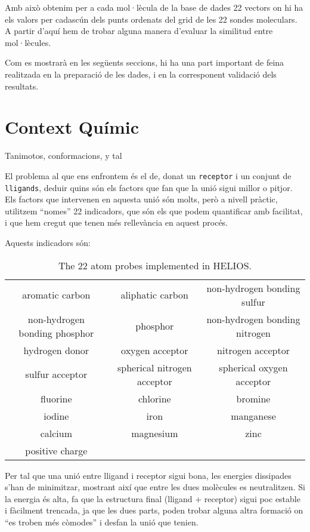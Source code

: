 \documentclass[titlepage,a4paper,12pt]{book}
\begin{document}
Amb això obtenim per a cada mol·lècula de la base de dades 22 vectors on hi ha els valors per cadascún dels punts ordenats del grid de les 22 sondes moleculars. A partir d'aquí hem de trobar alguna manera d'evaluar la similitud entre mol·lècules.

Com es mostrarà en les següents seccions, hi ha una part important de feina
realitzada en la preparació de les dades, i en la corresponent validació dels
resultats.


\section{Context Químic} %
\label{sec:Context Quimic}
Tanimotos, conformacions, y tal 

El problema al que ens enfrontem és el de, donat un \texttt{receptor} i un conjunt de %
\texttt{lligands}, deduir quins són els factors que fan que la unió sigui millor
o pitjor.  Els factors que intervenen en aquesta unió són molts, però a nivell
pràctic, utilitzem ``nomes'' 22 indicadors, que són els que podem quantificar
amb facilitat, i que hem cregut que tenen més rellevància en aquest procés.

Aquests indicadors són:

\begin{table}
\centering
\begin{tabular}{|ccc|}
\hline
aromatic carbon &aliphatic carbon&non-hydrogen bonding sulfur\\
non-hydrogen bonding phosphor&phosphor&non-hydrogen bonding nitrogen\\
hydrogen donor&oxygen acceptor&nitrogen acceptor\\
sulfur acceptor&spherical nitrogen acceptor&spherical oxygen acceptor\\
fluorine&chlorine&bromine\\
iodine&iron&manganese\\
calcium&magnesium&zinc\\
positive charge&& \\
\hline
\end{tabular}
\caption{The 22 atom probes implemented in HELIOS.}
\label{table:maps}
\end{table}

Per tal que una unió entre lligand i receptor sigui bona, les energies
dissipades s'han de minimitzar, mostrant així que entre les dues molècules es
neutralitzen.  Si la energia és alta, fa que la estructura final (lligand +
receptor) sigui poc estable i fàcilment trencada, ja que les dues parts, poden
trobar alguna altra formació on ``es troben més còmodes'' i desfan la unió que
tenien.
\end{document}
